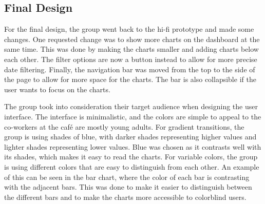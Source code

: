 \subsection{Final Design}\label{subsec:final-design}

For the final design, the group went back to the hi-fi prototype and made some changes.
One requested change was to show more charts on the dashboard at the same time.
This was done by making the charts smaller and adding charts below each other.
The filter options are now a button instead to allow for more precise date filtering.
Finally, the navigation bar was moved from the top to the side of the page to allow for more space for the charts.
The bar is also collapsible if the user wants to focus on the charts.

The group took into consideration their target audience when designing the user interface.
The interface is minimalistic, and the colors are simple to appeal to the co-workers at the café are mostly young
adults.
For gradient transitions, the group is using shades of blue, with darker shades representing higher values and lighter
shades representing lower values.
Blue was chosen as it contrasts well with its shades, which makes it easy to read the charts.
For variable colors, the group is using different colors that are easy to distinguish from each other.
An example of this can be seen in the bar chart, where the color of each bar is contrasting with the adjacent bars.
This was done to make it easier to distinguish between the different bars and to make the charts more accessible to
colorblind users.


